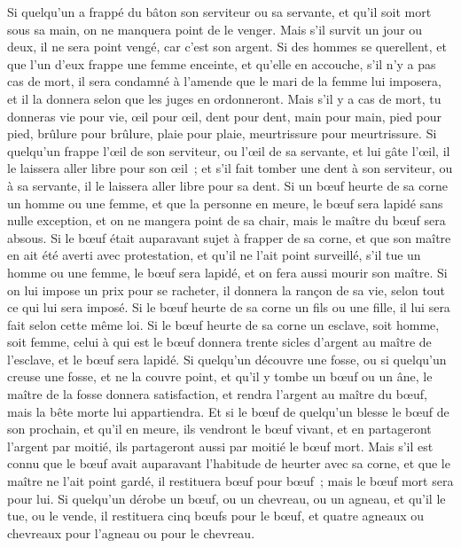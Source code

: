 \begin{multicols}{2}
Si quelqu'un a frappé du bâton son serviteur ou sa servante, et qu'il soit mort sous sa main, on ne manquera point de le venger.
Mais s'il survit un jour ou deux, il ne sera point vengé, car c'est son argent.
Si des hommes se querellent, et que l'un d'eux frappe une femme enceinte, et qu'elle en accouche, s'il n'y a pas cas de mort, il sera condamné à l'amende que le mari de la femme lui imposera, et il la donnera selon que les juges en ordonneront.
Mais s'il y a cas de mort, tu donneras vie pour vie,
œil pour œil, dent pour dent, main pour main, pied pour pied,
brûlure pour brûlure, plaie pour plaie, meurtrissure pour meurtrissure.
Si quelqu'un frappe l'œil de son serviteur, ou l'œil de sa servante, et lui gâte l'œil, il le laissera aller libre pour son œil~;
et s'il fait tomber une dent à son serviteur, ou à sa servante, il le laissera aller libre pour sa dent.
Si un bœuf heurte de sa corne un homme ou une femme, et que la personne en meure, le bœuf sera lapidé sans nulle exception, et on ne mangera point de sa chair, mais le maître du bœuf sera absous.
Si le bœuf était auparavant sujet à frapper de sa corne, et que son maître en ait été averti avec protestation, et qu'il ne l'ait point surveillé, s'il tue un homme ou une femme, le bœuf sera lapidé, et on fera aussi mourir son maître.
Si on lui impose un prix pour se racheter, il donnera la rançon de sa vie, selon tout ce qui lui sera imposé.
Si le bœuf heurte de sa corne un fils ou une fille, il lui sera fait selon cette même loi.
Si le bœuf heurte de sa corne un esclave, soit homme, soit femme, celui à qui est le bœuf donnera trente sicles d'argent au maître de l'esclave, et le bœuf sera lapidé.
Si quelqu'un découvre une fosse, ou si quelqu'un creuse une fosse, et ne la couvre point, et qu'il y tombe un bœuf ou un âne,
le maître de la fosse donnera satisfaction, et rendra l'argent au maître du bœuf, mais la bête morte lui appartiendra.
Et si le bœuf de quelqu'un blesse le bœuf de son prochain, et qu'il en meure, ils vendront le bœuf vivant, et en partageront l'argent par moitié, ils partageront aussi par moitié le bœuf mort.
Mais s'il est connu que le bœuf avait auparavant l'habitude de heurter avec sa corne, et que le maître ne l'ait point gardé, il restituera bœuf pour bœuf~; mais le bœuf mort sera pour lui.
\VerseOne{}Si quelqu'un dérobe un bœuf, ou un chevreau, ou un agneau, et qu'il le tue, ou le vende, il restituera cinq bœufs pour le bœuf, et quatre agneaux ou chevreaux pour l'agneau ou pour le chevreau.

\end{multicols}
